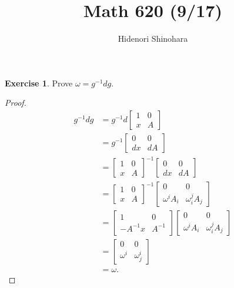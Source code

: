 \documentclass[12pt, psamsfonts]{amsart}
\theoremstyle{definition}
\newtheorem*{exer}{Exercise}
\theoremstyle{remark}
\numberwithin{equation}{section}
\begin{document}
\title{Math 620 (9/17)}
\author{Hidenori Shinohara}
\maketitle

\begin{exer}
  Prove $\omega = g^{-1}dg$.
\end{exer}

\begin{proof}
  \begin{align*}
    g^{-1}dg
      &= g^{-1}d\begin{bmatrix} 1 & 0 \\ x & A \end{bmatrix} \\
      &= g^{-1}\begin{bmatrix} 0 & 0 \\ dx & dA \end{bmatrix} \\
      &= \begin{bmatrix} 1 & 0 \\ x & A \end{bmatrix}^{-1}\begin{bmatrix} 0 & 0 \\ dx & dA \end{bmatrix} \\
      &= \begin{bmatrix} 1 & 0 \\ x & A \end{bmatrix}^{-1}\begin{bmatrix} 0 & 0 \\ \omega^iA_i & \omega^j_i A_j \end{bmatrix} \\
      &= \begin{bmatrix} 1 & 0 \\ -A^{-1}x & A^{-1} \end{bmatrix}\begin{bmatrix} 0 & 0 \\ \omega^iA_i & \omega^j_i A_j \end{bmatrix} \\
      &= \begin{bmatrix} 0 & 0 \\ \omega^i & \omega^i_j \end{bmatrix} \\
      &= \omega.
  \end{align*}
\end{proof}
\end{document}

